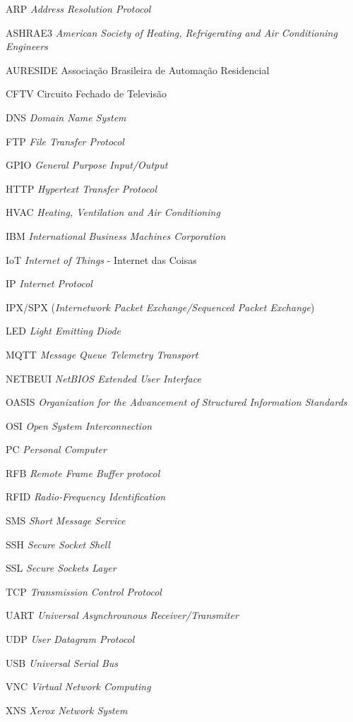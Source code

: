 \documentclass[
12pt,
openany, %
oneside, %
a4paper,			
english,			
brazil			        %
]{abntbibufjf}
\begin{document}
	\begin{siglas}
	
	\item [ARP] \textit{Address Resolution Protocol}
	\item [ASHRAE3] \textit{American Society of Heating, Refrigerating and Air Conditioning Engineers}
	\item[AURESIDE] Associação Brasileira de Automação Residencial
	\item [CFTV] Circuito Fechado de Televisão
	\item [DNS] \textit{Domain Name System}
	\item [FTP] \textit{File Transfer Protocol}
	\item [GPIO] \textit{General Purpose Input/Output}
    \item [HTTP] \textit{Hypertext Transfer Protocol}
	\item [HVAC] \textit{Heating, Ventilation and Air Conditioning}
	\item [IBM] \textit{International Business Machines Corporation}
	\item [IoT] \textit{Internet of Things} - Internet das Coisas
	\item [IP] \textit{Internet Protocol}
	\item [IPX/SPX] (\textit{Internetwork Packet Exchange/Sequenced Packet Exchange})
	\item [LED] \textit{Light Emitting Diode}
	\item [MQTT] \textit{Message Queue Telemetry Transport}
	\item [NETBEUI] \textit{NetBIOS Extended User Interface}
	\item [OASIS] \textit{Organization for the Advancement of Structured Information Standards}
	\item [OSI] \textit{Open System Interconnection}
	\item [PC] \textit{Personal Computer}
	\item [RFB] \textit{Remote Frame Buffer protocol}
	\item [RFID] \textit{Radio-Frequency Identification}
	\item [SMS] \textit{Short Message Service}
	\item [SSH] \textit{Secure Socket Shell}
	\item [SSL] \textit{Secure Sockets Layer}
	\item [TCP] \textit{Transmission Control Protocol}
	\item [UART] \textit{Universal Asynchrounous Receiver/Transmiter}
	\item [UDP] \textit{User Datagram Protocol}
	\item [USB] \textit{Universal Serial Bus}
	\item [VNC] \textit{Virtual Network Computing}
	\item [XNS] \textit{Xerox Network System}
		
	\end{siglas}
	
\end{document}
